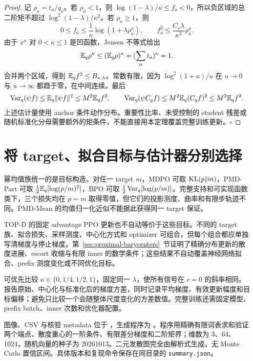 \begin{proof}
记 $\rho_a=t_a/q_a$。若 $\rho_a<1$，则 $\log(1-\lambda)/\kappa\le f_a<0$，所以负区域的总二阶矩不超过 $\log^2(1-\lambda)/\kappa^2$。若 $\rho_a\ge1$，则
\begin{equation}
 0\le f_a\le\frac1\kappa\log(1+\lambda\rho_a^\kappa),\qquad
 f_a^2\le\frac{C_\star\lambda}{\kappa^2}\rho_a^\kappa.
\end{equation}
由于 $x^\kappa$ 对 $0<\kappa\le1$ 是凹函数，Jensen 不等式给出
\begin{equation}
 \mathbb E_q\rho^\kappa\le(\mathbb E_q\rho)^\kappa=(\sum_at_a)^\kappa=1.
\end{equation}
合并两个区域，得到 $\mathbb E_q f^2\le B_{\kappa,\lambda}$。常数有限，因为 $\log^2(1+u)/u$ 在 $u\to0$ 与 $u\to\infty$ 都趋于零，在中间连续。最后
\begin{equation}
 \operatorname{Var}_q(\psi f)\le\mathbb E_q\|\psi f\|^2\le M^2\mathbb E_qf^2,
 \qquad
 \operatorname{Var}_q(\psi C_qf)\le M^2\mathbb E_q(C_qf)^2\le M^2\mathbb E_qf^2.
\end{equation}
上述估计量使用 anchor 条件动作分布。重要性比率、未受控制的 student 残差或随机标准化分母需要额外的矩条件，不能直接用本定理覆盖完整训练更新。\hfill$\square$
\end{proof}

\section{将 target、拟合目标与估计器分别选择}

幂均值族统一的是目标构造。对任一 target $m$，MDPO 可取 $\operatorname{KL}(p\Vert m)$，PMD-Part 可取 $\tfrac12\mathbb E_q[\log(p/m)^2]$，BPO 可取 $\tfrac12\operatorname{Var}_q[\log(p/m)]$。完整支持和可实现函数类下，三个损失均在 $p=m$ 取得零值，但它们的投影测度、曲率和有限步轨迹不同。PMD-Mean 的均值归一化近似不能据此获得同一 target 保证。

TOP-D 的固定 advantage PPO 更新也不自动等价于这些目标。不同的 target 族、拟合损失、采样测度、中心化方式和 optimizer 可组合，但每个组合都应单独写清梯度与停止梯度。第~\ref{sec:proximal-barycenters}~节证明了精确分布更新的散度进展、escort 收缩与有限 inner 的数学条件；这些结果不自动覆盖神经网络拟合、prefix 测度变化或不同优化目标。

可优先比较 $\kappa\in\{0,1/4,1/2,1\}$，固定同一 $\lambda$，使所有信号在 $r=0$ 的斜率相同。报告原始、中心化与标准化后的梯度方差，同时记录平均梯度、有效更新幅度和目标偏移；避免只比较一个会随整体尺度变化的方差数值。完整训练还需固定模型、prefix batch、inner 次数和优化器配置。

图像、CSV 与核验 metadata 位于 ，生成程序为 。程序用精确有限词表求和验证两个端点、散度重心的一阶条件、有限差分梯度和二阶矩界；维数为 3、64、1024，随机向量的种子为 20261013。二元发散图完全由解析式生成，无 Monte Carlo 置信区间。具体版本和复现命令保存在同目录的 \texttt{summary.json}。
